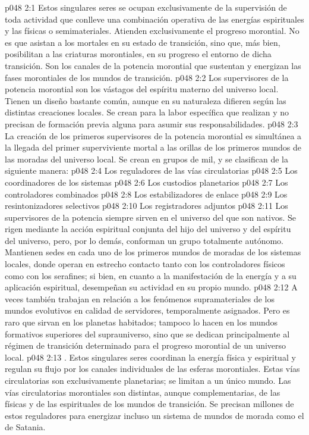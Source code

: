 \vs p048 2:1 Estos singulares seres se ocupan exclusivamente de la supervisión de toda actividad que conlleve una combinación operativa de las energías espirituales y las físicas o semimateriales. Atienden exclusivamente el progreso morontial. No es que asistan a los mortales en su estado de transición, sino que, más bien, posibilitan a las criaturas morontiales, en su progreso el entorno de dicha transición. Son los canales de la potencia morontial que sustentan y energizan las fases morontiales de los mundos de transición.
\vs p048 2:2 Los supervisores de la potencia morontial son los vástagos del espíritu materno del universo local. Tienen un diseño bastante común, aunque en su naturaleza difieren según las distintas creaciones locales. Se crean para la labor específica que realizan y no precisan de formación previa alguna para asumir sus responsabilidades.
\vs p048 2:3 La creación de los primeros supervisores de la potencia morontial es simultánea a la llegada del primer superviviente mortal a las orillas de los primeros mundos de las moradas del universo local. Se crean en grupos de mil, y se clasifican de la siguiente manera:
\vs p048 2:4 Los reguladores de las vías circulatorias
\vs p048 2:5 Los coordinadores de los sistemas
\vs p048 2:6 Los custodios planetarios
\vs p048 2:7 Los controladores combinados
\vs p048 2:8 Los estabilizadores de enlace
\vs p048 2:9 Los resintonizadores selectivos
\vs p048 2:10 Los registradores adjuntos
\vs p048 2:11 \pc Los supervisores de la potencia siempre sirven en el universo del que son nativos. Se rigen mediante la acción espiritual conjunta del hijo del universo y del espíritu del universo, pero, por lo demás, conforman un grupo totalmente autónomo. Mantienen sedes en cada uno de los primeros mundos de moradas de los sistemas locales, donde operan en estrecho contacto tanto con los controladores físicos como con los serafines; si bien, en cuanto a la manifestación de la energía y a su aplicación espiritual, desempeñan su actividad en su propio mundo.
\vs p048 2:12 A veces también trabajan en relación a los fenómenos supramateriales de los mundos evolutivos en calidad de servidores, temporalmente asignados. Pero es raro que sirvan en los planetas habitados; tampoco lo hacen en los mundos formativos superiores del suprauniverso, sino que se dedican principalmente al régimen de transición determinado para el progreso morontial de un universo local.
\vs p048 2:13 . Estos singulares seres coordinan la energía física y espiritual y regulan su flujo por los canales individuales de las esferas morontiales. Estas vías circulatorias son exclusivamente planetarias; se limitan a un único mundo. Las vías circulatorias morontiales son distintas, aunque complementarias, de las físicas y de las espirituales de los mundos de transición. Se precisan millones de estos reguladores para energizar incluso un sistema de mundos de morada como el de Satania.
